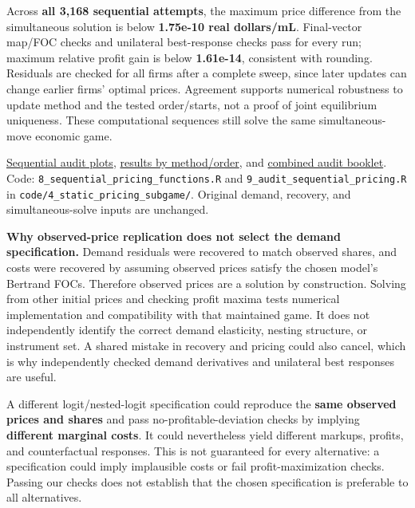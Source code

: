 \documentclass[10pt,]{article}
\begin{document}
Across \textbf{all 3,168 sequential attempts}, the maximum price
difference from the simultaneous solution is below \textbf{1.75e-10 real
dollars/mL}. Final-vector map/FOC checks and unilateral best-response
checks pass for every run; maximum relative profit gain is below
\textbf{1.61e-14}, consistent with rounding. Residuals are checked for
all firms after a complete sweep, since later updates can change earlier
firms' optimal prices. Agreement supports numerical robustness to update
method and the tested order/starts, not a proof of joint equilibrium
uniqueness. These computational sequences still solve the same
simultaneous-move economic game.

\href{../../output/static_pricing_subgame/manual_fixed_point_2026-10-28/audit/sequential_checks_2026-11-02/sequential_pricing_audit.pdf}{Sequential
audit plots},
\href{../../output/static_pricing_subgame/manual_fixed_point_2026-10-28/audit/sequential_checks_2026-11-02/comparison_summary.csv}{results
by method/order}, and
\href{../../output/static_pricing_subgame/manual_fixed_point_2026-10-28/audit/pricing_audit_plots_with_sequential.pdf}{combined
audit booklet}. Code: \texttt{8\_sequential\_pricing\_functions.R} and
\texttt{9\_audit\_sequential\_pricing.R} in
\texttt{code/4\_static\_pricing\_subgame/}. Original demand, recovery,
and simultaneous-solve inputs are unchanged.

\textbf{Why observed-price replication does not select the demand
specification.} Demand residuals were recovered to match observed
shares, and costs were recovered by assuming observed prices satisfy the
chosen model's Bertrand FOCs. Therefore observed prices are a solution
by construction. Solving from other initial prices and checking profit
maxima tests numerical implementation and compatibility with that
maintained game. It does not independently identify the correct demand
elasticity, nesting structure, or instrument set. A shared mistake in
recovery and pricing could also cancel, which is why independently
checked demand derivatives and unilateral best responses are useful.

A different logit/nested-logit specification could reproduce the
\textbf{same observed prices and shares} and pass
no-profitable-deviation checks by implying \textbf{different marginal
costs}. It could nevertheless yield different markups, profits, and
counterfactual responses. This is not guaranteed for every alternative:
a specification could imply implausible costs or fail
profit-maximization checks. Passing our checks does not establish that
the chosen specification is preferable to all alternatives.
\end{document}
